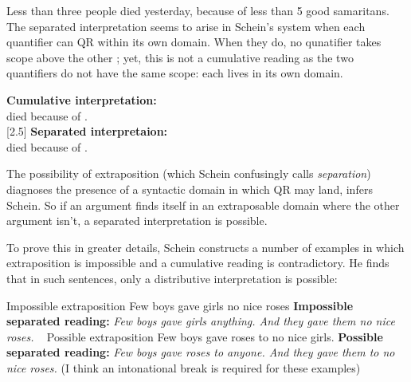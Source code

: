 \documentclass[english]{article}
\begin{document}
\ex
Less than three people died yesterday, because of less than 5 good samaritans.
\xe
%
The separated interpretation seems to arise in Schein's system when each quantifier can QR within its own domain. When they do, no qunatifier takes scope above the other ; yet, this is not a cumulative reading as the two quantifiers do not have the same scope: each lives in its own domain.

\pex
\a 
\textbf{Cumulative interpretation:}\\
 \hspace{5ex}  died because of .\\[2ex]
[2.5] %
\a \textbf{Separated interpretaion:}\\
 \hspace{5ex}  died  because of .\\[2ex]
\xe
%


The possibility of extraposition (which Schein confusingly calls \emph{separation}) diagnoses the presence of a syntactic domain in which QR may land, infers Schein. So if an argument finds itself in an extraposable domain where the other argument isn't, a separated interpretation is possible.

To prove this in greater details, Schein constructs a number of examples in which extraposition is impossible and a cumulative reading is contradictory. He finds that in such sentences, only a distributive interpretation is possible:

\pex Impossible extraposition
 \a 
 Few boys gave girls no nice roses
 \a 
 \textbf{Impossible separated reading:} \emph{Few boys gave girls anything. And they gave them no nice roses.}
 \xe
\pex~ Possible extraposition
\a 
Few boys gave roses to no nice girls.
\a 
 \textbf{Possible separated reading:} \emph{Few boys gave roses to anyone. And they gave them to no nice roses.}
\xe
%
(I think an intonational break is required for these examples)
\end{document}
